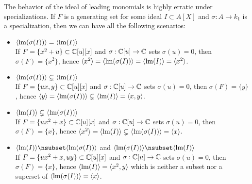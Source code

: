 \begin{example}\upshape
  The behavior of the ideal of leading monomials is highly erratic under specializations. If $F$ is a generating set for some ideal $I \subset A[X]$ and $\sigma : A \to k_{1}$ is a specialization, then we can have all the following scenarios:
  \begin{itemize}
    \item $\langle \operatorname{lm}(\sigma(I)) \rangle = \langle \operatorname{lm}(I) \rangle$ \\ If $F = \{x^{2} + u\} \subset \mathbb{C}[u][x]$ and $\sigma : \mathbb{C}[u] \to \mathbb{C}$ sets $\sigma(u) = 0$, then $\sigma(F) = \{x^{2}\}$, hence $\langle x^{2} \rangle = \langle \operatorname{lm}(\sigma(I)) \rangle = \langle \operatorname{lm}(I) \rangle = \langle x^{2} \rangle$.

    \item $\langle \operatorname{lm}(\sigma(I)) \rangle \subsetneq \langle \operatorname{lm}(I) \rangle$ \\ If $F = \{ux, y\} \subset \mathbb{C}[u][x]$ and $\sigma : \mathbb{C}[u] \to \mathbb{C}$ sets $\sigma(u) = 0$, then $\sigma(F) = \{y\}$, hence $\langle y \rangle = \langle \operatorname{lm}(\sigma(I)) \rangle \subsetneq \langle \operatorname{lm}(I) \rangle = \langle x, y \rangle$.

    \item $\langle \operatorname{lm}(I) \rangle \subsetneq \langle \operatorname{lm}(\sigma(I)) \rangle$ \\ If $F = \{ux^{2} + x\} \subset \mathbb{C}[u][x]$ and $\sigma : \mathbb{C}[u] \to \mathbb{C}$ sets $\sigma(u) = 0$, then $\sigma(F) = \{x\}$, hence $\langle x^{2} \rangle = \langle \operatorname{lm}(I) \rangle \subsetneq \langle \operatorname{lm}(\sigma(I)) \rangle = \langle x \rangle$.

    \item $\langle \LM(I) \rangle \nsubset \langle \LM(\sigma(I)) \rangle$ and $\langle \LM(\sigma(I)) \rangle \nsubset \langle \LM(I) \rangle$ \\ If $F = \{ux^{2} + x, uy\} \subset \mathbb{C}[u][x]$ and $\sigma : \mathbb{C}[u] \to \mathbb{C}$ sets $\sigma(u) = 0$, then $\sigma(F) = \{x\}$, hence $\langle \operatorname{lm}(I) \rangle = \langle x^{2}, y \rangle$ which is neither a subset nor a superset of $\langle \operatorname{lm}(\sigma(I)) \rangle = \langle x \rangle$.
  \end{itemize}
\end{example}


